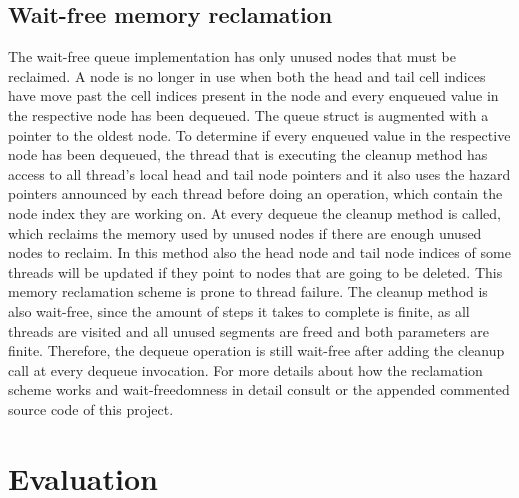 \documentclass{article}
\begin{document}
\subsection{Wait-free memory reclamation}
The wait-free queue implementation has only unused nodes that must be reclaimed. A node is no longer in use when both the head and tail cell indices have move past the cell indices present in the node and every enqueued value in the respective node has been dequeued. The queue struct is augmented with a pointer to the oldest node. To determine if every enqueued value in the respective node has been dequeued, the thread that is executing the cleanup method has access to all thread's local head and tail node pointers and it also uses the hazard pointers announced by each thread before doing an operation, which contain the node index they are working on. At every dequeue the cleanup method is called, which reclaims the memory used by unused nodes if there are enough unused nodes to reclaim. In this method also the head node and tail node indices of some threads will be updated if they point to nodes that are going to be deleted. This memory reclamation scheme is prone to thread failure. The cleanup method is also wait-free, since the amount of steps it takes to complete is finite, as all threads are visited and all unused segments are freed and both parameters are finite. Therefore, the dequeue operation is still wait-free after adding the cleanup call at every dequeue invocation. For more details about how the reclamation scheme works and wait-freedomness in detail consult \cite{WFQ} or the appended commented source code of this project.
\clearpage
\section{Evaluation}
\end{document}

